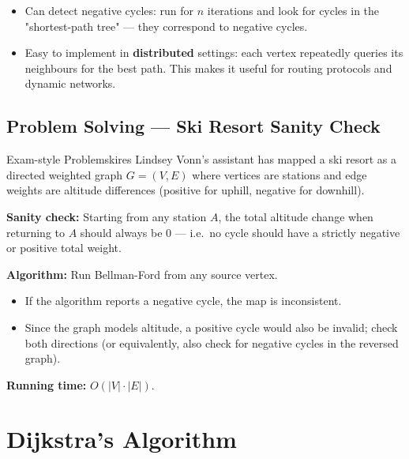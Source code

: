 \begin{itemize}[noitemsep]
  \item Can detect negative cycles: run for $n$ iterations and look for cycles in the
        "shortest-path tree" — they correspond to negative cycles.
  \item Easy to implement in \textbf{distributed} settings: each vertex repeatedly queries
        its neighbours for the best path. This makes it useful for routing protocols and
        dynamic networks.
\end{itemize}

\subsection{Problem Solving — Ski Resort Sanity Check}

\begin{remark}{Exam-style Problem}{skires}
Lindsey Vonn's assistant has mapped a ski resort as a directed weighted graph $G = (V,E)$
where vertices are stations and edge weights are altitude differences (positive for uphill,
negative for downhill).

\textbf{Sanity check:} Starting from any station $A$, the total altitude change when returning
to $A$ should always be 0 — i.e.\ no cycle should have a strictly negative or positive total
weight.

\textbf{Algorithm:} Run Bellman-Ford from any source vertex.
\begin{itemize}[noitemsep]
  \item If the algorithm reports a negative cycle, the map is inconsistent.
  \item Since the graph models altitude, a positive cycle would also be invalid; check both
        directions (or equivalently, also check for negative cycles in the reversed graph).
\end{itemize}
\textbf{Running time:} $O(|V| \cdot |E|)$.
\end{remark}

\section*{Dijkstra's Algorithm}

